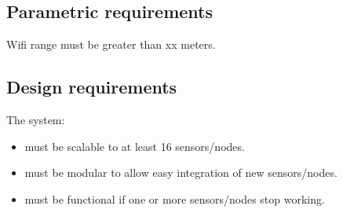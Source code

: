 \subsection{Parametric requirements}
Wifi range must be greater than xx meters.

\subsection{Design requirements}
The system:
\begin{itemize}
\item must be scalable to at least 16 sensors/nodes.
\item must be modular to allow easy integration of new sensors/nodes.
\item must be functional if one or more sensors/nodes stop working.	 
\end{itemize}


